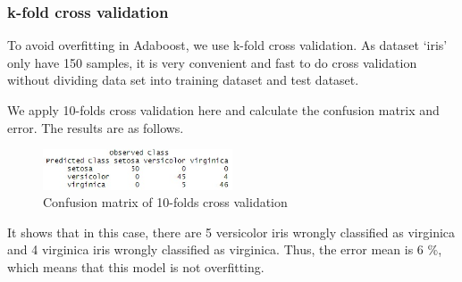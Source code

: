 \documentclass[../SMLreport_template.tex]{subfiles}
\begin{document}
\subsubsection{k-fold cross validation}
To avoid overfitting in Adaboost, we use k-fold cross validation. As dataset ‘iris’ only have 150 samples, it is very convenient and fast to do cross validation without dividing data set into training dataset and test dataset.\par

We apply 10-folds cross validation here and calculate the confusion matrix and error.
The results are as follows.\par
  \begin{figure}[t]
    \centering
    \includegraphics[width=0.5\textwidth]{sections/images/CM_of_10.jpg}
    \caption{Confusion matrix of 10-folds cross validation}
\end{figure}
It shows that in this case, there are 5 versicolor iris wrongly classified as virginica and 4 virginica iris wrongly classified as virginica. Thus, the error mean is 6 $\%$, which means that this model is not overfitting.
\end{document}

